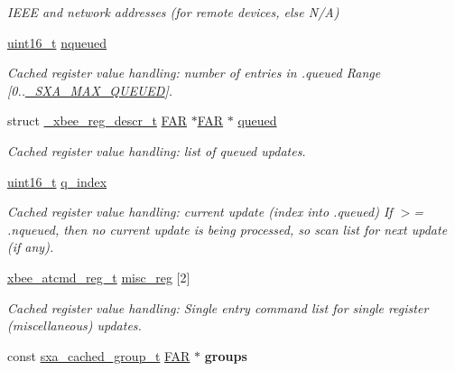 \begin{DoxyCompactItemize}
\begin{DoxyCompactList}\small\item\em I\-E\-E\-E and network addresses (for remote devices, else N/\-A) \end{DoxyCompactList}\item 
\hyperlink{group__hal_ga5a8b2dc9e45a9ee81a94ef304fb62505}{uint16\-\_\-t} \hyperlink{structsxa__node__t_a8de35431542d2c2508bb17ac8fa48a84}{nqueued}
\begin{DoxyCompactList}\small\item\em Cached register value handling\-: number of entries in .queued Range \mbox{[}0..\hyperlink{sxa_8h_a9e47d5fe0e89846d0bc2b3f1584382ae}{\-\_\-\-S\-X\-A\-\_\-\-M\-A\-X\-\_\-\-Q\-U\-E\-U\-E\-D}\mbox{]}. \end{DoxyCompactList}\item 
struct \hyperlink{struct__xbee__reg__descr__t}{\-\_\-xbee\-\_\-reg\-\_\-descr\-\_\-t} \hyperlink{group__hal_gaef060b3456fdcc093a7210a762d5f2ed}{F\-A\-R} $\ast$\hyperlink{group__hal_gaef060b3456fdcc093a7210a762d5f2ed}{F\-A\-R} $\ast$ \hyperlink{structsxa__node__t_a4be7d670379c92c9d32f55bc02a81add}{queued}
\begin{DoxyCompactList}\small\item\em Cached register value handling\-: list of queued updates. \end{DoxyCompactList}\item 
\hyperlink{group__hal_ga5a8b2dc9e45a9ee81a94ef304fb62505}{uint16\-\_\-t} \hyperlink{structsxa__node__t_a8aa02a31241baba968d2892c98971c65}{q\-\_\-index}
\begin{DoxyCompactList}\small\item\em Cached register value handling\-: current update (index into .queued) If $>$= .nqueued, then no current update is being processed, so scan list for next update (if any). \end{DoxyCompactList}\item 
\hyperlink{structxbee__atcmd__reg__t}{xbee\-\_\-atcmd\-\_\-reg\-\_\-t} \hyperlink{structsxa__node__t_ae825a2809f705ef65c961e8bfe3e98cc}{misc\-\_\-reg} \mbox{[}2\mbox{]}
\begin{DoxyCompactList}\small\item\em Cached register value handling\-: Single entry command list for single register (miscellaneous) updates. \end{DoxyCompactList}\item 
\hypertarget{structsxa__node__t_a41aeca059e6fef32cb611359925a0c5c}{const \hyperlink{structsxa__cached__group__t}{sxa\-\_\-cached\-\_\-group\-\_\-t} \hyperlink{group__hal_gaef060b3456fdcc093a7210a762d5f2ed}{F\-A\-R} $\ast$ {\bfseries groups}}\label{structsxa__node__t_a41aeca059e6fef32cb611359925a0c5c}


\end{DoxyCompactItemize}
